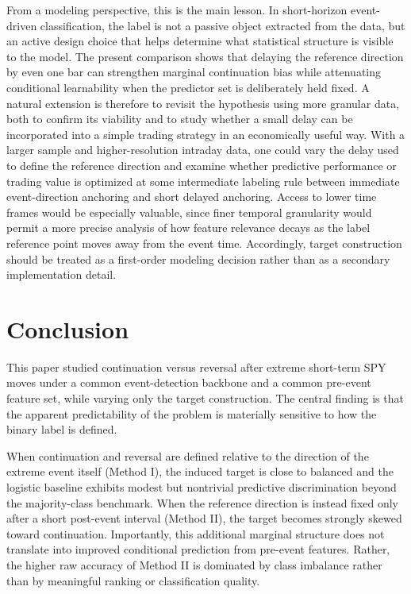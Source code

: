 \documentclass[11pt,a4paper]{article}
\begin{document}
		From a modeling perspective, this is the main lesson. In short-horizon event-driven classification, the label is not a passive object extracted from the data, but an active design choice that helps determine what statistical structure is visible to the model. The present comparison shows that delaying the reference direction by even one bar can strengthen marginal continuation bias while attenuating conditional learnability when the predictor set is deliberately held fixed. A natural extension is therefore to revisit the hypothesis using more granular data, both to confirm its viability and to study whether a small delay can be incorporated into a simple trading strategy in an economically useful way. With a larger sample and higher-resolution intraday data, one could vary the delay used to define the reference direction and examine whether predictive performance or trading value is optimized at some intermediate labeling rule between immediate event-direction anchoring and short delayed anchoring. Access to lower time frames would be especially valuable, since finer temporal granularity would permit a more precise analysis of how feature relevance decays as the label reference point moves away from the event time. Accordingly, target construction should be treated as a first-order modeling decision rather than as a secondary implementation detail.

	
	\section{Conclusion}

	This paper studied continuation versus reversal after extreme short-term SPY moves under a common event-detection backbone and a common pre-event feature set, while varying only the target construction. The central finding is that the apparent predictability of the problem is materially sensitive to how the binary label is defined.

	When continuation and reversal are defined relative to the direction of the extreme event itself (Method I), the induced target is close to balanced and the logistic baseline exhibits modest but nontrivial predictive discrimination beyond the majority-class benchmark. When the reference direction is instead fixed only after a short post-event interval (Method II), the target becomes strongly skewed toward continuation. Importantly, this additional marginal structure does not translate into improved conditional prediction from pre-event features. Rather, the higher raw accuracy of Method II is dominated by class imbalance rather than by meaningful ranking or classification quality.
\end{document}
